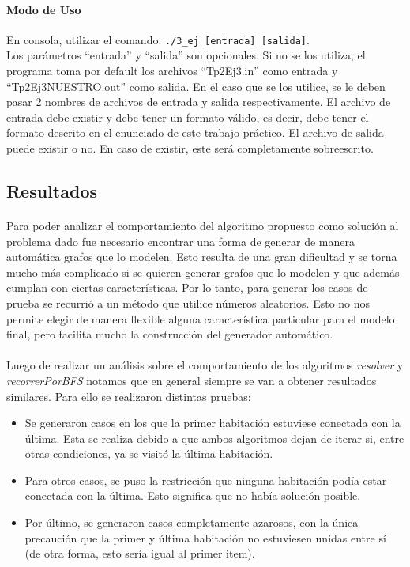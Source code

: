 \paragraph{Modo de Uso}
En consola, utilizar el comando: \texttt{./3\_ej [entrada] [salida]}.\\
Los parámetros ``entrada'' y ``salida'' son opcionales. Si no se los utiliza, el programa toma por default los archivos ``Tp2Ej3.in'' como entrada y ``Tp2Ej3NUESTRO.out'' como salida. En el caso que se los utilice, se le deben pasar 2 nombres de archivos de entrada y salida respectivamente. El archivo de entrada debe existir y debe tener un formato válido, es decir, debe tener el formato descrito en el enunciado de este trabajo práctico. El archivo de salida puede existir o no. En caso de existir, este será completamente sobreescrito.


\subsection{Resultados}
\label{resultados3}
\paragraph{}
Para poder analizar el comportamiento del algoritmo propuesto como solución al problema dado fue necesario encontrar una forma de generar de manera automática grafos que lo modelen. Esto resulta de una gran dificultad y se torna mucho más complicado si se quieren generar grafos que lo modelen y que además cumplan con ciertas características. Por lo tanto, para generar los casos de prueba se recurrió a un método que utilice números aleatorios. Esto no nos permite elegir de manera flexible alguna característica particular para el modelo final, pero facilita mucho la construcción del generador automático.

\paragraph{}
Luego de realizar un análisis sobre el comportamiento de los algoritmos \textit{resolver} y \textit{recorrerPorBFS} notamos que en general siempre se van a obtener resultados similares. Para ello se realizaron distintas pruebas: 
\begin{itemize}
  \item Se generaron casos en los que la primer habitación estuviese conectada con la última. Esta se realiza debido a que ambos algoritmos dejan de iterar si, entre otras condiciones, ya se visitó la última habitación.
  \item Para otros casos, se puso la restricción que ninguna habitación podía estar conectada con la última. Esto significa que no había solución posible.
  \item Por último, se generaron casos completamente azarosos, con la única precaución que la primer y última habitación no estuviesen unidas entre sí (de otra forma, esto sería igual al primer item).
\end{itemize}

